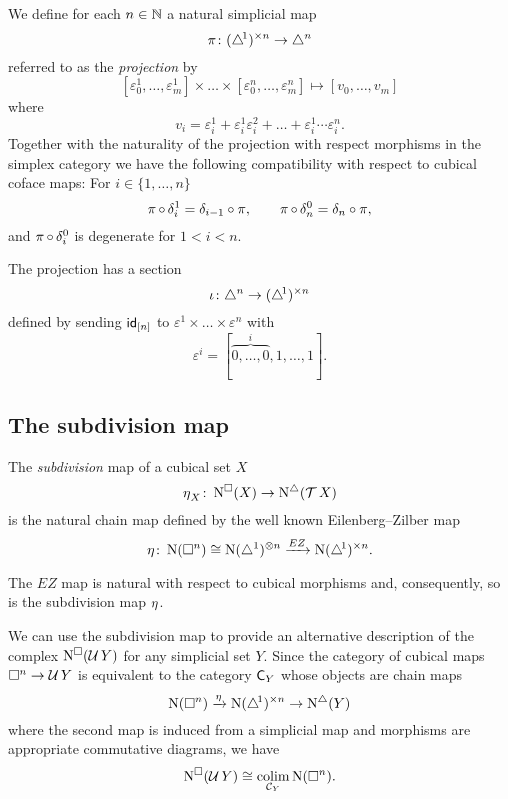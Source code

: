 We define for each $n \in \mathbb{N}$ a natural simplicial map
\[
\operatorname{\pi} \colon (\triangle^{\!1})^{\times n} \to \triangle^n
\]
referred to as the \textit{projection} by
\[
[\varepsilon_0^1, \dots, \varepsilon_m^1] \times \dots \times [ \varepsilon_0^n, \dots, \varepsilon_m^n] \mapsto
[v_0, \dots, v_m]
\]
where
\[
v_i = \varepsilon_i^1 + \varepsilon_i^1 \varepsilon_i^2 + \dots + \varepsilon_i^1 \dotsm \varepsilon_i^n.
\]
Together with the naturality of the projection with respect morphisms in the simplex category we have the following compatibility with respect to cubical coface maps:
For $i \in \{1,\dots,n\}$
\begin{equation} \label{e:projection cubical compatibility}
\operatorname{\pi} \circ \, \delta_i^1 = \delta_{i-1} \circ \pi, \qquad
\operatorname{\pi} \circ \, \delta_n^0 = \delta_{n} \circ \pi,
\end{equation}
and $\operatorname{\pi} \circ \, \delta^0_i$ is degenerate for $1 < i < n$.

The projection has a section
\[
\operatorname{\iota} \colon \triangle^n \to (\triangle^{\!1})^{\times n}
\]
defined by sending $\mathsf{id}_{[n]}$ to $\varepsilon^1 \times \dots \times \varepsilon^n$ with
\[
\varepsilon^i = [\overbrace{0, \dots, 0}^{i}, 1, \dots, 1].
\]


\subsection{The subdivision map}

The \textit{subdivision} map of a cubical set $X$
\[
\operatorname{\eta}_X \colon \operatorname{N^{\square}}(X) \to \operatorname{N^{\triangle}}(\operatorname{\mathcal{T}} X)
\]
is the natural chain map defined by the well known Eilenberg--Zilber map
\[
\operatorname{\eta} \colon \operatorname{N}(\square^n) \cong \operatorname{N}(\triangle^1)^{\otimes n} \xrightarrow{EZ} \operatorname{N} (\triangle^{\!1})^{\times n}.
\]

The $EZ$ map is natural with respect to cubical morphisms and, consequently, so is the subdivision map $\operatorname{\eta}$.

We can use the subdivision map to provide an alternative description of the complex $\operatorname{N^{\square}}(\operatorname{\mathcal{U}} Y)$ for any simplicial set $Y$.
Since the category of cubical maps $\square^n \to \operatorname{\mathcal{U}} Y$ is equivalent to the category $\mathsf{C}_Y$ whose objects are chain maps
\[
\operatorname{N}(\square^n) \xrightarrow{\operatorname{\eta}} \operatorname{N} (\triangle^{\!1})^{\times n} \to \operatorname{N^{\triangle}}(Y)
\]
where the second map is induced from a simplicial map
and morphisms are appropriate commutative diagrams, we have
\begin{equation} \label{e:alternative description of NUY}
\operatorname{N^{\square}}(\operatorname{\mathcal{U}} Y) \cong \operatorname*{colim}_{\mathcal{C}_Y} \operatorname{N}(\square^n).
\end{equation}

